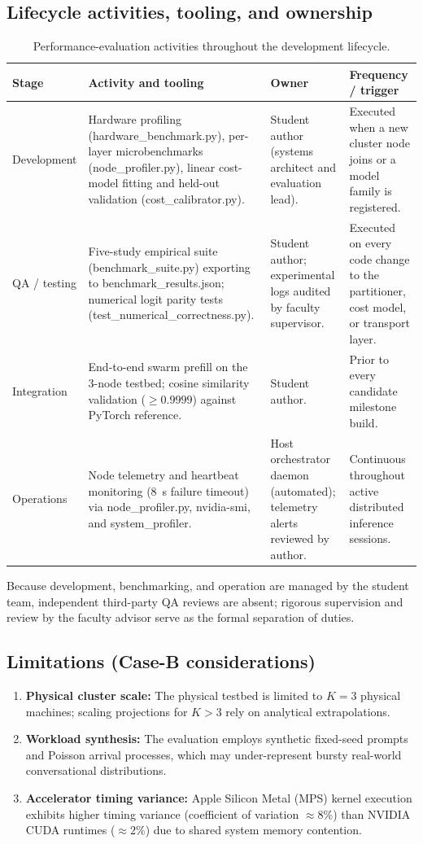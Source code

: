 \documentclass[10pt,a4paper]{article}
\newcommand{\code}[1]{{\ttfamily\footnotesize #1}}
\begin{document}
\subsection{Lifecycle activities, tooling, and ownership}
\begin{table}[H]
\centering\footnotesize
\caption{Performance-evaluation activities throughout the development lifecycle.}
\begin{tabularx}{\textwidth}{@{}p{1.6cm} Y p{3.2cm} p{2.8cm}@{}}
\toprule
Stage & Activity and tooling & Owner & Frequency / trigger\\
\midrule
Development & Hardware profiling (\code{hardware\_benchmark.py}), per-layer microbenchmarks (\code{node\_profiler.py}), linear cost-model fitting and held-out validation (\code{cost\_calibrator.py}). & Student author (systems architect and evaluation lead). & Executed when a new cluster node joins or a model family is registered.\\
QA / testing & Five-study empirical suite (\code{benchmark\_suite.py}) exporting to \code{benchmark\_results.json}; numerical logit parity tests (\code{test\_numerical\_correctness.py}). & Student author; experimental logs audited by faculty supervisor. & Executed on every code change to the partitioner, cost model, or transport layer.\\
Integration & End-to-end swarm prefill on the 3-node testbed; cosine similarity validation ($\ge 0.9999$) against PyTorch reference. & Student author. & Prior to every candidate milestone build.\\
Operations & Node telemetry and heartbeat monitoring (8~s failure timeout) via \code{node\_profiler.py}, \code{nvidia-smi}, and \code{system\_profiler}. & Host orchestrator daemon (automated); telemetry alerts reviewed by author. & Continuous throughout active distributed inference sessions.\\
\bottomrule
\end{tabularx}
\end{table}
Because development, benchmarking, and operation are managed by the student team, independent third-party QA reviews are absent; rigorous supervision and review by the faculty advisor serve as the formal separation of duties.

\subsection{Limitations (Case-B considerations)}
\begin{enumerate}
\item \textbf{Physical cluster scale:} The physical testbed is limited to $K=3$ physical machines; scaling projections for $K>3$ rely on analytical extrapolations.
\item \textbf{Workload synthesis:} The evaluation employs synthetic fixed-seed prompts and Poisson arrival processes, which may under-represent bursty real-world conversational distributions.
\item \textbf{Accelerator timing variance:} Apple Silicon Metal (MPS) kernel execution exhibits higher timing variance (coefficient of variation $\approx 8\%$) than NVIDIA CUDA runtimes ($\approx 2\%$) due to shared system memory contention.
\end{enumerate}
\end{document}
